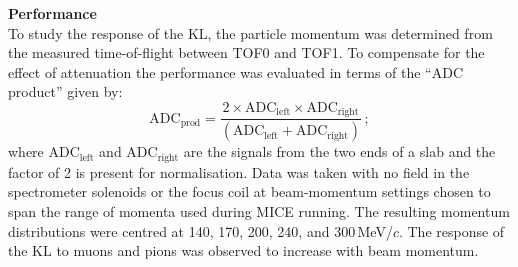 \newpage 

\noindent\textbf{Performance} \\
\noindent
To study the response of the KL, the particle momentum was determined from the
measured time-of-flight between TOF0 and TOF1.
To compensate for the effect of attenuation the performance was
evaluated in terms of the ``ADC product'' given by:
\begin{equation}
  \text{ADC}_{\text{prod}} = \frac{2 \times
    \text{ADC}_{\text{left}} \times \text{ADC}_{\text{right}}}{
    (\text{ADC}_{\text{left}} + \text{ADC}_{\text{right}})}\,;
\end{equation}
where ADC$_{\text{left}}$ and ADC$_{\text{right}}$ are the signals
from the two ends of a slab and the factor of 2 is present for
normalisation.
Data was taken with no field in the spectrometer solenoids or the
focus coil at beam-momentum settings chosen to span the range of
momenta used during MICE running.
The resulting momentum distributions were centred at 140, 170,
200, 240, and 300\,MeV/$c$.
The response of the KL to muons and pions was observed to increase with
beam momentum.
  
